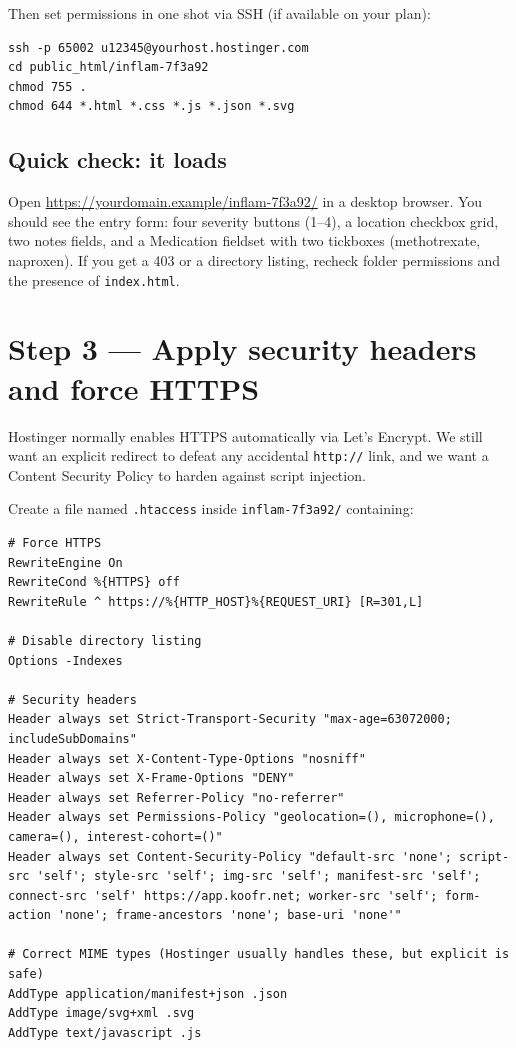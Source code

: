 \documentclass[11pt,a4paper]{article}
\begin{document}
Then set permissions in one shot via SSH (if available on your plan):

\begin{lstlisting}[language=shell]
ssh -p 65002 u12345@yourhost.hostinger.com
cd public_html/inflam-7f3a92
chmod 755 .
chmod 644 *.html *.css *.js *.json *.svg
\end{lstlisting}

\subsection{Quick check: it loads}

Open \url{https://yourdomain.example/inflam-7f3a92/} in a desktop browser. You should see the entry form: four severity buttons (1--4), a location checkbox grid, two notes fields, and a Medication fieldset with two tickboxes (methotrexate, naproxen). If you get a 403 or a directory listing, recheck folder permissions and the presence of \texttt{index.html}.

\section{Step 3 --- Apply security headers and force HTTPS}

Hostinger normally enables HTTPS automatically via Let's Encrypt. We still want an explicit redirect to defeat any accidental \texttt{http://} link, and we want a Content Security Policy to harden against script injection.

Create a file named \texttt{.htaccess} inside \texttt{inflam-7f3a92/} containing:

\begin{lstlisting}[language=htaccess]
# Force HTTPS
RewriteEngine On
RewriteCond %{HTTPS} off
RewriteRule ^ https://%{HTTP_HOST}%{REQUEST_URI} [R=301,L]

# Disable directory listing
Options -Indexes

# Security headers
Header always set Strict-Transport-Security "max-age=63072000; includeSubDomains"
Header always set X-Content-Type-Options "nosniff"
Header always set X-Frame-Options "DENY"
Header always set Referrer-Policy "no-referrer"
Header always set Permissions-Policy "geolocation=(), microphone=(), camera=(), interest-cohort=()"
Header always set Content-Security-Policy "default-src 'none'; script-src 'self'; style-src 'self'; img-src 'self'; manifest-src 'self'; connect-src 'self' https://app.koofr.net; worker-src 'self'; form-action 'none'; frame-ancestors 'none'; base-uri 'none'"

# Correct MIME types (Hostinger usually handles these, but explicit is safe)
AddType application/manifest+json .json
AddType image/svg+xml .svg
AddType text/javascript .js
\end{lstlisting}
\end{document}
